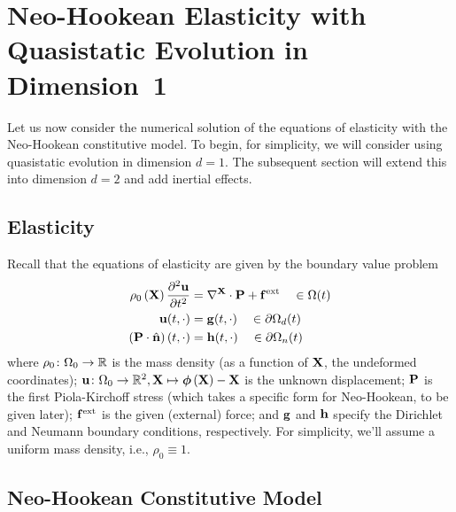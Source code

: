 \section{Neo-Hookean Elasticity with Quasistatic Evolution in Dimension~1}

Let us now consider the numerical solution of the equations of elasticity with the Neo-Hookean constitutive model. To begin, for simplicity, we will consider using quasistatic evolution in dimension $d = 1$. The subsequent section will extend this into dimension $d = 2$ and add inertial effects.

\subsection{Elasticity}

Recall that the equations of elasticity are given by the boundary value problem
\begin{subequations}\label{eq:elasticity.i}
\begin{align}
\rho_0 \left( \mathbf{X} \right) \frac{\partial^2 \mathbf{u}}{\partial t^2} & = \nabla^{\mathbf{X}} \cdot \mathbf{P} + \mathbf{f}^{\text{ext}} \quad \in \Omega(t) \\
\mathbf{u}(t,\cdot) & = \mathbf{g}(t,\cdot) \quad \in \partial \Omega_d(t) \\
\left( \mathbf{P} \cdot \hat{\mathbf{n}} \right) (t,\cdot) & = \mathbf{h}(t,\cdot) \quad \in \partial \Omega_n(t)
\end{align}
\end{subequations}
where $\rho_0 \colon \Omega_0 \to \mathbb{R}$ is the mass density (as a function of $\mathbf{X}$, the undeformed coordinates); $\mathbf{u} \colon \Omega_0 \to \mathbb{R}^2, \mathbf{X} \mapsto \boldsymbol{\phi} \left( \mathbf{X} \right) - \mathbf{X}$ is the unknown displacement; $\mathbf{P}$ is the first Piola-Kirchoff stress (which takes a specific form for Neo-Hookean, to be given later); $\mathbf{f}^{\text{ext}}$ is the given (external) force; and $\mathbf{g}$ and $\mathbf{h}$ specify the Dirichlet and Neumann boundary conditions, respectively. For simplicity, we'll assume a uniform mass density, i.e., $\rho_0 \equiv 1$.

\subsection{Neo-Hookean Constitutive Model}


